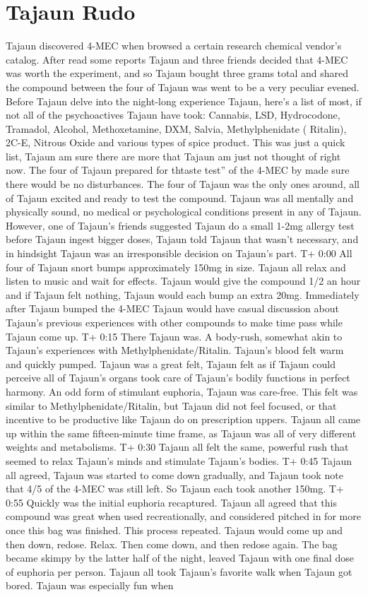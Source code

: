 \documentclass[12pt]{book}
\begin{document}
\chapter{Tajaun Rudo}

Tajaun discovered 4-MEC when browsed a certain research chemical vendor's catalog. After read some reports Tajaun and three friends decided that 4-MEC was worth the experiment, and so Tajaun bought three grams total and shared the compound between the four of Tajaun was went to be a very peculiar evened. Before Tajaun delve into the night-long experience Tajaun, here's a list of most, if not all of the psychoactives Tajaun have took: Cannabis, LSD, Hydrocodone, Tramadol, Alcohol, Methoxetamine, DXM, Salvia, Methylphenidate ( Ritalin), 2C-E, Nitrous Oxide and various types of spice product. This was just a quick list, Tajaun am sure there are more that Tajaun am just not thought of right now. The four of Tajaun prepared for thtaste test'' of the 4-MEC by made sure there would be no disturbances. The four of Tajaun was the only ones around, all of Tajaun excited and ready to test the compound. Tajaun was all mentally and physically sound, no medical or psychological conditions present in any of Tajaun. However, one of Tajaun's friends suggested Tajaun do a small 1-2mg allergy test before Tajaun ingest bigger doses, Tajaun told Tajaun that wasn't necessary, and in hindsight Tajaun was an irresponsible decision on Tajaun's part. T+ 0:00 All four of Tajaun snort bumps approximately 150mg in size. Tajaun all relax and listen to music and wait for effects. Tajaun would give the compound 1/2 an hour and if Tajaun felt nothing, Tajaun would each bump an extra 20mg. Immediately after Tajaun bumped the 4-MEC Tajaun would have casual discussion about Tajaun's previous experiences with other compounds to make time pass while Tajaun come up. T+ 0:15 There Tajaun was. A body-rush, somewhat akin to Tajaun's experiences with Methylphenidate/Ritalin. Tajaun's blood felt warm and quickly pumped. Tajaun was a great felt, Tajaun felt as if Tajaun could perceive all of Tajaun's organs took care of Tajaun's bodily functions in perfect harmony. An odd form of stimulant euphoria, Tajaun was care-free. This felt was similar to Methylphenidate/Ritalin, but Tajaun did not feel focused, or that incentive to be productive like Tajaun do on prescription uppers. Tajaun all came up within the same fifteen-minute time frame, as Tajaun was all of very different weights and metabolisms. T+ 0:30 Tajaun all felt the same, powerful rush that seemed to relax Tajaun's minds and stimulate Tajaun's bodies. T+ 0:45 Tajaun all agreed, Tajaun was started to come down gradually, and Tajaun took note that 4/5 of the 4-MEC was still left. So Tajaun each took another 150mg. T+ 0:55 Quickly was the initial euphoria recaptured. Tajaun all agreed that this compound was great when used recreationally, and considered pitched in for more once this bag was finished. This process repeated. Tajaun would come up and then down, redose. Relax. Then come down, and then redose again. The bag became skimpy by the latter half of the night, leaved Tajaun with one final dose of euphoria per person. Tajaun all took Tajaun's favorite walk when Tajaun got bored. Tajaun was especially fun when 
\end{document}
